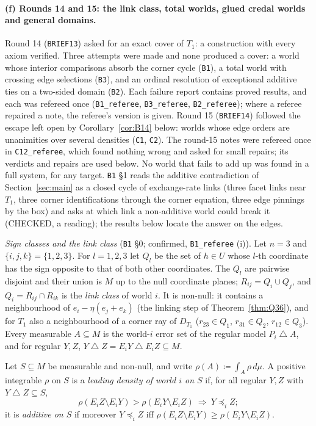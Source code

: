 \documentclass[11pt]{article}
\theoremstyle{definition}
\theoremstyle{remark}
\newcommand{\sd}{\mathbin{\triangle}}
\newcommand{\src}[1]{\texttt{#1}}
\begin{document}
\paragraph{(f) Rounds 14 and 15: the link class, total worlds, glued credal worlds and general domains.} Round 14 (\src{BRIEF13}) asked for an exact cover of $T_1$: a construction with every axiom verified. Three attempts were made and none produced a cover: a world whose interior comparisons absorb the corner cycle (\src{B1}), a total world with crossing edge selections (\src{B3}), and an ordinal resolution of exceptional additive ties on a two-sided domain (\src{B2}). Each failure report contains proved results, and each was refereed once (\src{B1\_referee}, \src{B3\_referee}, \src{B2\_referee}); where a referee repaired a note, the referee's version is given. Round 15 (\src{BRIEF14}) followed the escape left open by Corollary~\ref{cor:B14} below: worlds whose edge orders are unanimities over several densities (\src{C1}, \src{C2}). The round-15 notes were refereed once in \src{C12\_referee}, which found nothing wrong and asked for small repairs; its verdicts and repairs are used below. No world that fails to add up was found in a full system, for any target. \src{B1} \S1 reads the additive contradiction of Section~\ref{sec:main} as a closed cycle of exchange-rate links (three facet links near $T_1$, three corner identifications through the corner equation, three edge pinnings by the box) and asks at which link a non-additive world could break it (CHECKED, a reading); the results below locate the answer on the edges.

\emph{Sign classes and the link class} (\src{B1} \S0; confirmed, \src{B1\_referee} (i)). Let $n=3$ and $\{i,j,k\}=\{1,2,3\}$. For $l=1,2,3$ let $Q_l$ be the set of $h\in U$ whose $l$-th coordinate has the sign opposite to that of both other coordinates. The $Q_l$ are pairwise disjoint and their union is $M$ up to the null coordinate planes; $R_{ij}=Q_i\cup Q_j$, and $Q_i=R_{ij}\cap R_{ik}$ is the \emph{link class} of world $i$. It is non-null: it contains a neighbourhood of $e_i-\eta(e_j+e_k)$ (the linking step of Theorem~\ref{thm:Q36}), and for $T_1$ also a neighbourhood of a corner ray of $D_{T_1}$ ($r_{23}\in Q_1$, $r_{31}\in Q_2$, $r_{12}\in Q_3$). Every measurable $A\subseteq M$ is the world-$i$ error set of the regular model $P_i\sd A$, and for regular $Y,Z$, $Y\sd Z=E_iY\sd E_iZ\subseteq M$.

Let $S\subseteq M$ be measurable and non-null, and write $\rho(A)\coloneqq\int_A\rho\,d\mu$. A positive integrable $\rho$ on $S$ is a \emph{leading density of world $i$ on $S$} if, for all regular $Y,Z$ with $Y\sd Z\subseteq S$,
\[
\rho(E_iZ\setminus E_iY)>\rho(E_iY\setminus E_iZ)\ \Longrightarrow\ Y\preceq_iZ ;\tag{L1}
\]
it is \emph{additive on $S$} if moreover $Y\preceq_iZ$ iff $\rho(E_iZ\setminus E_iY)\ge\rho(E_iY\setminus E_iZ)$.
\end{document}
